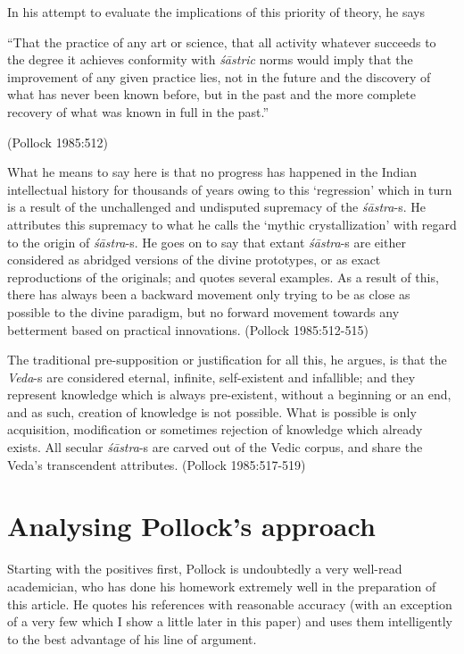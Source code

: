 In his attempt to evaluate the implications of this priority of theory, he says
\begin{myquote}
``That the practice of any art or science, that all activity whatever succeeds to the degree it achieves conformity with {\em śāstric} norms would imply that the improvement of any given practice lies, not in the future and the discovery of what has never been known before, but in the past and the more complete recovery of what was known in full in the past.'' 

\hfill (Pollock 1985:512)
\end{myquote}

What he means to say here is that no progress has happened in the Indian intellectual history for thousands of years owing to this `regression' which in turn is a result of the unchallenged and undisputed supremacy of the {\it śāstra}-s. He attributes this supremacy to what he calls the `mythic crystallization' with regard to the origin of {\it śāstra}-s. He goes on to say that extant {\it śāstra}-s are either considered as abridged versions of the divine prototypes, or as exact reproductions of the originals; and quotes several examples. As a result of this, there has always been a backward movement only trying to be as close as possible to the divine paradigm, but no forward movement towards any betterment based on practical innovations. (Pollock 1985:512-515)

The traditional pre-supposition or justification for all this, he argues, is that the {\it Veda}-s are considered eternal, infinite, self-existent and infallible; and they represent knowledge which is always pre-existent, without a beginning or an end, and as such, creation of knowledge is not possible. What is possible is only acquisition, modification or sometimes rejection of knowledge which already exists. All secular {\it śāstra}-s are carved out of the Vedic corpus, and share the Veda's transcendent attributes. (Pollock 1985:517-519)

\section*{Analysing Pollock's approach}

Starting with the positives first, Pollock is undoubtedly a very well-read academician, who has done his homework extremely well in the preparation of this article. He quotes his references with reasonable accuracy (with an exception of a very few which I show a little later in this paper) and uses them intelligently to the best advantage of his line of argument. 

